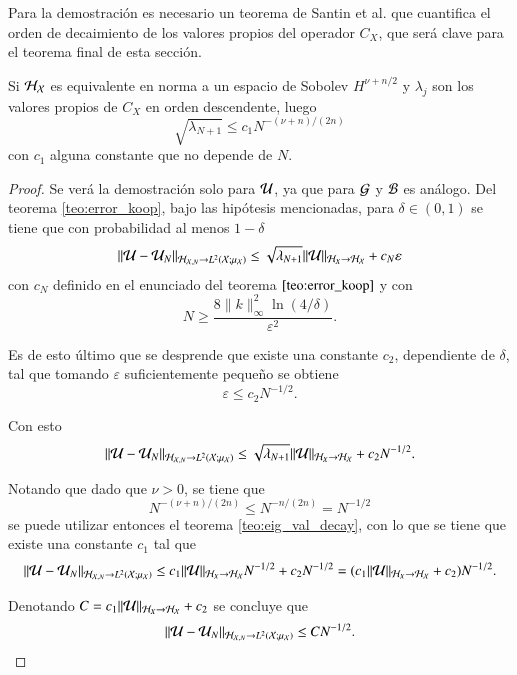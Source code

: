 Para la demostración es necesario un teorema de Santin et al. que cuantifica el orden de decaimiento de los valores propios del operador $C_X$, que será clave para el teorema final de esta sección.

\begin{teo}
    Si $\mathcal{H}_{\mathcal{X}}$ es equivalente en norma a un espacio de Sobolev $H^{\nu + n/2}$ y $\lambda_j$ son los valores propios de $C_X$ en orden descendente, luego
    \begin{equation*}
        \sqrt{\lambda_{N+1}} \leq c_1 N^{-(\nu + n)/(2n)}
    \end{equation*}
    con $c_1$ alguna constante que no depende de $N$.
    \label{teo:eig_val_decay}
\end{teo}

\begin{proof}
    Se verá la demostración solo para $\mathcal{U}$, ya que para $\mathcal{G}$ y $\mathcal{B}$ es análogo. Del teorema \ref{teo:error_koop}, bajo las hipótesis mencionadas, para $\delta \in (0, 1)$ se tiene que con probabilidad al menos $1-\delta$
    \[
    \|\mathcal{U} - \mathcal{U}_N \|_{\mathcal{H}_{\mathcal{X}, N} \to L^2(\mathcal{X}; \mu_{\mathcal{X}})} \leq \sqrt{\lambda_{N+1}} \|\mathcal{U} \|_{\mathcal{H}_{X} \to \mathcal{H_{\mathcal{X}}}} + c_N \varepsilon
    \]
    con $c_N$ definido en el enunciado del teorema $\ref{teo:error_koop}$ y con 
    \begin{equation*}
        N \geq \frac{8\|k\|^2_\infty \ln(4/\delta)}{\varepsilon^2}.
    \end{equation*}
    
    Es de esto último que se desprende que existe una constante $c_2$, dependiente de $\delta$, tal que tomando $\varepsilon$ suficientemente pequeño se obtiene
    \begin{equation*}
        \varepsilon \leq c_2 N^{-1/2}.
    \end{equation*}
    
    Con esto
    \[
    \|\mathcal{U} - \mathcal{U}_N \|_{\mathcal{H}_{\mathcal{X}, N} \to L^2(\mathcal{X}; \mu_{\mathcal{X}})} \leq \sqrt{\lambda_{N+1}} \|\mathcal{U} \|_{\mathcal{H}_{X} \to \mathcal{H_{\mathcal{X}}}} + c_2 N^{-1/2}.
    \]
    
    Notando que dado que $\nu > 0$, se tiene que 
    \begin{equation*}
        N^{-(\nu + n)/(2n)} \leq N^{-n/(2n)} = N^{-1/2}
    \end{equation*}
    se puede utilizar entonces el teorema \ref{teo:eig_val_decay}, con lo que se tiene que existe una constante $c_1$ tal que
    \[
    \|\mathcal{U} - \mathcal{U}_N \|_{\mathcal{H}_{\mathcal{X}, N} \to L^2(\mathcal{X}; \mu_{\mathcal{X}})} \leq c_1 \|\mathcal{U} \|_{\mathcal{H}_{X} \to \mathcal{H_{\mathcal{X}}}} N^{-1/2} + c_2 N^{-1/2} = (c_1 \|\mathcal{U} \|_{\mathcal{H}_{X} \to \mathcal{H_{\mathcal{X}}}} + c_2) N^{-1/2}.
    \]
    
    Denotando $C = c_1 \|\mathcal{U} \|_{\mathcal{H}_{X} \to \mathcal{H_{\mathcal{X}}}} + c_2$ se concluye que
    \[
    \|\mathcal{U} - \mathcal{U}_N \|_{\mathcal{H}_{\mathcal{X}, N} \to L^2(\mathcal{X}; \mu_{\mathcal{X}})} \leq C N^{-1/2}.
    \]
\end{proof}

